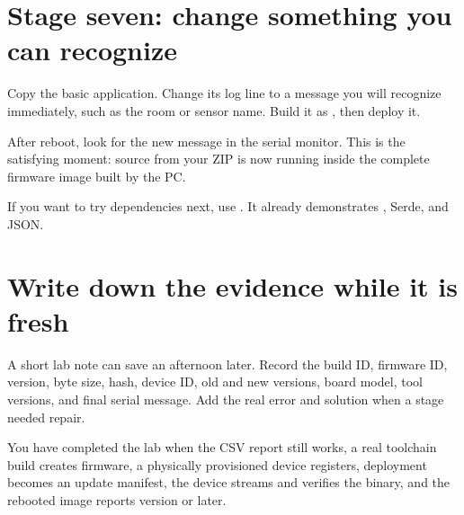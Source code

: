 \section{Stage seven: change something you can recognize}

Copy the basic application. Change its log line to a message you will recognize immediately, such as the room or sensor name. Build it as , then deploy it.

After reboot, look for the new message in the serial monitor. This is the satisfying moment: source from your ZIP is now running inside the complete firmware image built by the PC.

If you want to try dependencies next, use . It already demonstrates , Serde, and JSON.

\section{Write down the evidence while it is fresh}

A short lab note can save an afternoon later. Record the build ID, firmware ID, version, byte size, hash, device ID, old and new versions, board model, tool versions, and final serial message. Add the real error and solution when a stage needed repair.

\begin{checkpoint}
You have completed the lab when the CSV report still works, a real toolchain build creates firmware, a physically provisioned device registers, deployment becomes an update manifest, the device streams and verifies the binary, and the rebooted image reports version  or later.
\end{checkpoint}

